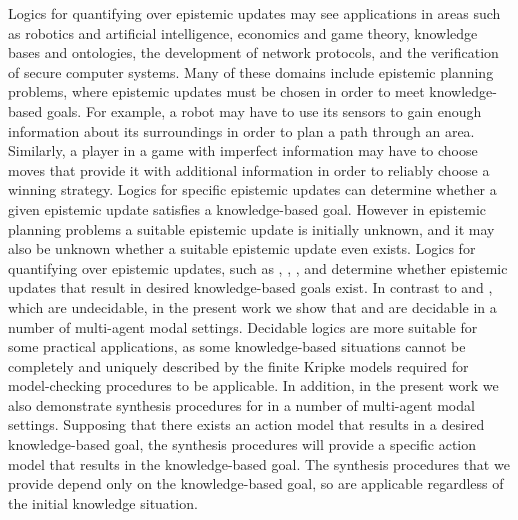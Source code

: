 Logics for quantifying over epistemic updates may see applications in areas such as robotics and artificial intelligence, economics and game theory, knowledge bases and ontologies, the development of network protocols, and the verification of secure computer systems.
Many of these domains include epistemic planning problems, where epistemic updates must be chosen in order to meet knowledge-based goals.
For example, a robot may have to use its sensors to gain enough information about its surroundings in order to plan a path through an area.
Similarly, a player in a game with imperfect information may have to choose moves that provide it with additional information in order to reliably choose a winning strategy.
Logics for specific epistemic updates can determine whether a given epistemic update satisfies a knowledge-based goal.
However in epistemic planning problems a suitable epistemic update is initially unknown, and it may also be unknown whether a suitable epistemic update even exists.
Logics for quantifying over epistemic updates, such as \logicApal{}, \logicGal{}, \logicRml{}, and \logicAaml{} determine whether epistemic updates that result in desired knowledge-based goals exist.
In contrast to \logicApal{} and \logicGal{}, which are undecidable, in the present work we show that \logicRml{} and \logicAaml{} are decidable in a number of multi-agent modal settings.
Decidable logics are more suitable for some practical applications, as some knowledge-based situations cannot be completely and uniquely described by the finite Kripke models required for model-checking procedures to be applicable.
In addition, in the present work we also demonstrate synthesis procedures for \logicAaml{} in a number of multi-agent modal settings.
Supposing that there exists an action model that results in a desired knowledge-based goal, the synthesis procedures will provide a specific action model that results in the knowledge-based goal.
The synthesis procedures that we provide depend only on the knowledge-based goal, so are applicable regardless of the initial knowledge situation.

